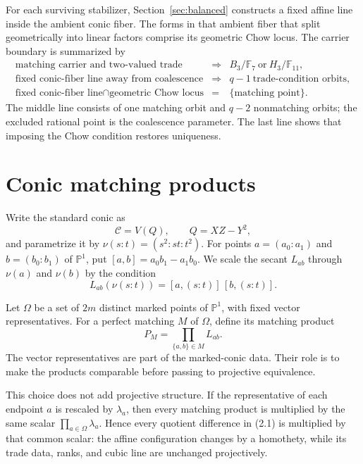 \documentclass[11pt]{article}
\theoremstyle{definition}
\theoremstyle{remark}
\newcommand{\F}{\mathbb{F}}
\newcommand{\cC}{\mathcal{C}}
\begin{document}
For each surviving stabilizer, Section~\ref{sec:balanced} constructs a fixed
affine line inside the ambient conic fiber.  The forms in that ambient fiber
that split geometrically into linear factors comprise its geometric Chow
locus.  The carrier boundary is summarized by
\[
\begin{array}{rcl}
 \text{matching carrier and two-valued trade}
   &\Longrightarrow& B_3/\F_7\ \text{or}\ H_3/\F_{11},\\[2pt]
 \text{fixed conic-fiber line away from coalescence}
   &\Longrightarrow& q-1\ \text{trade-condition orbits},\\[2pt]
 \text{fixed conic-fiber line}\cap\text{geometric Chow locus}
   &=& \{\text{matching point}\}.
\end{array}                                                   \tag{1.1}
\]
The middle line consists of one matching orbit and \(q-2\) nonmatching
orbits; the excluded rational point is the coalescence parameter.  The last
line shows that imposing the Chow condition restores uniqueness.

\section{Conic matching products}
\label{sec:matching-products}

Write the standard conic as
\[
 \cC=V(Q),\qquad Q=XZ-Y^2,
\]
and parametrize it by $\nu(s:t)=(s^2:st:t^2)$.  For points
$a=(a_0:a_1)$ and $b=(b_0:b_1)$ of $\mathbb P^1$, put
$[a,b]=a_0b_1-a_1b_0$.  We scale the secant $L_{ab}$ through
$\nu(a)$ and $\nu(b)$ by the condition
\[
 L_{ab}(\nu(s:t))=[a,(s:t)]\,[b,(s:t)].
\]

Let $\Omega$ be a set of $2m$ distinct marked points of $\mathbb P^1$,
with fixed vector representatives.  For a perfect matching $M$ of
$\Omega$, define its matching product
\[
 P_M=\prod_{\{a,b\}\in M}L_{ab}.
\]
The vector representatives are part of the marked-conic data.  Their
role is to make the products comparable before passing to projective
equivalence.

This choice does not add projective structure.  If the representative of
each endpoint \(a\) is rescaled by \(\lambda_a\), then every matching product
is multiplied by the same scalar \(\prod_{a\in\Omega}\lambda_a\).  Hence every
quotient difference in (2.1) is multiplied by that common scalar: the affine
configuration changes by a homothety, while its trade data, ranks, and cubic
line are unchanged projectively.
\end{document}
